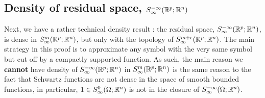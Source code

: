 \documentclass{article}
\begin{document}
\subsection{Density of residual space, $S^{-\infty}_\infty({\mathbb R}^{p}; {\mathbb R}^n)$ }

Next, we have a rather technical density result : the residual space, $S^{-\infty}_\infty({\mathbb R}^{p}; {\mathbb R}^n)$, is dense in $S^{m}_\infty({\mathbb R}^p; {\mathbb R}^n)$, but only with the topology of $S^{m + \epsilon}_\infty({\mathbb R}^{p}; {\mathbb R}^n)$. The main strategy in this proof is to approximate any symbol with the very same symbol but cut off by a compactly supported function. As such, the main reason we \textbf{cannot} have density of $S^{-\infty}_\infty({\mathbb R}^p; {\mathbb R}^n)$ in $S^m_\infty({\mathbb R}^p; {\mathbb R}^n)$ is the same reason to the fact that Schwartz functions are not dense in the space of smooth bounded functions, in particular, $1 \in S^0_\infty(\Omega; {\mathbb R}^n)$ is not in the closure of $S^{-\infty}_\infty(\Omega; {\mathbb R}^n)$. \\
\end{document}
